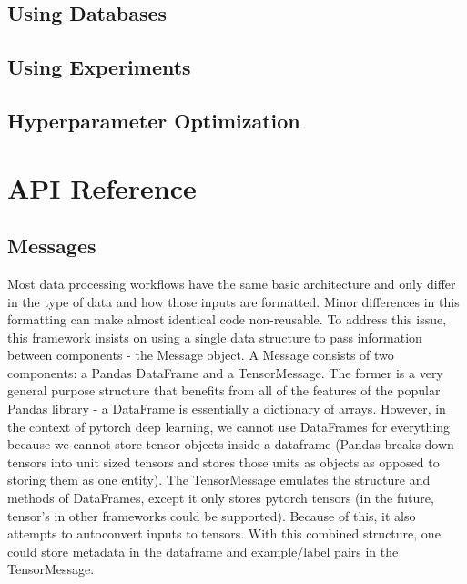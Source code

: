 \documentclass[letterpaper,10pt,english]{sphinxmanual}
\begin{document}
\subsection{Using Databases}
\label{\detokenize{Tutorial:using-databases}}

\subsection{Using Experiments}
\label{\detokenize{Tutorial:using-experiments}}

\subsection{Hyperparameter Optimization}
\label{\detokenize{Tutorial:hyperparameter-optimization}}

\section{API Reference}
\label{\detokenize{Fireworks:module-Fireworks}}\label{\detokenize{Fireworks:api-reference}}\label{\detokenize{Fireworks::doc}}

\subsection{Messages}
\label{\detokenize{Fireworks:messages}}
Most data processing workflows have the same basic architecture and only differ in the type of data and how those inputs are formatted. Minor differences in this formatting can make almost identical code non-reusable. To address this issue, this framework insists on using a single data structure to pass information between components - the Message object.
A Message consists of two components: a Pandas DataFrame and a TensorMessage. The former is a very general purpose structure that benefits from all of the features of the popular Pandas library - a DataFrame is essentially a dictionary of arrays. However, in the context of pytorch deep learning, we cannot use DataFrames for everything because we cannot store tensor objects inside a dataframe (Pandas breaks down tensors into unit sized tensors and stores those units as objects as opposed to storing them as one entity). The TensorMessage emulates the structure and methods of DataFrames, except it only stores pytorch tensors (in the future, tensor’s in other frameworks could be supported). Because of this, it also attempts to autoconvert inputs to tensors. With this combined structure, one could store metadata in the dataframe and example/label pairs in the TensorMessage.
\end{document}
